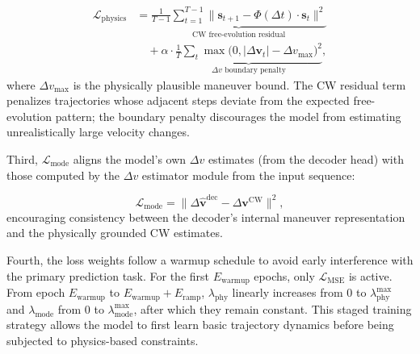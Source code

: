 \documentclass[a4paper,fleqn]{cas-dc}
\newcommand{\biPhi}{\bm{\mathit{\Phi}}} %
\begin{document}
\begin{equation}
    \begin{aligned}
        \mathcal{L}_{\text{physics}} & =
        \underbrace{\frac{1}{T-1}\sum_{t=1}^{T-1} \bigl\|\bm{s}_{t+1} - \biPhi(\Delta t) \cdot \bm{s}_t\bigr\|^2}_{\text{CW free-evolution residual}}                                      \\
                                     & \quad + \alpha \cdot \underbrace{\frac{1}{T}\sum_{t} \max\bigl(0, |\Delta \bm{v}_t| - \Delta v_{\max}\bigr)^2}_{\Delta v \text{ boundary penalty}},
    \end{aligned}
\end{equation}
where $\Delta v_{\max}$ is the physically plausible maneuver bound. The CW residual term penalizes trajectories whose adjacent steps deviate from the expected free-evolution pattern; the boundary penalty discourages the model from estimating unrealistically large velocity changes.

Third, $\mathcal{L}_{\text{mode}}$ aligns the model's own $\Delta v$ estimates (from the decoder head) with those computed by the $\Delta v$ estimator module from the input sequence:

\begin{equation}
    \mathcal{L}_{\text{mode}} = \bigl\|\Delta \hat{\bm{v}}^{\text{dec}} - \Delta \bm{v}^{\text{CW}}\bigr\|^2,
\end{equation}
encouraging consistency between the decoder's internal maneuver representation and the physically grounded CW estimates.

Fourth, the loss weights follow a warmup schedule to avoid early interference with the primary prediction task. For the first $E_{\text{warmup}}$ epochs, only $\mathcal{L}_{\text{MSE}}$ is active. From epoch $E_{\text{warmup}}$ to $E_{\text{warmup}} + E_{\text{ramp}}$, $\lambda_{\text{phy}}$ linearly increases from 0 to $\lambda_{\text{phy}}^{\max}$ and $\lambda_{\text{mode}}$ from 0 to $\lambda_{\text{mode}}^{\max}$, after which they remain constant. This staged training strategy allows the model to first learn basic trajectory dynamics before being subjected to physics-based constraints.
\end{document}
